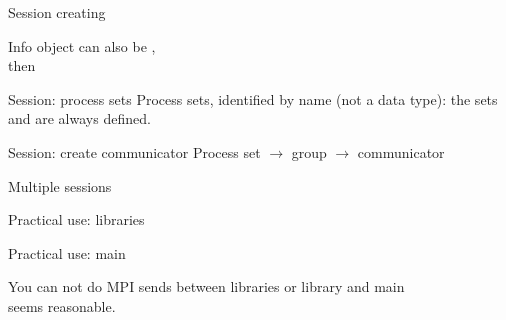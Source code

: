 \begin{numberedframe}{Session creating}

  Info object can also be , \\
  then
\end{numberedframe}

\begin{numberedframe}{Session: process sets}
  Process sets, identified by name (not a data type):
  the sets  and  are always defined.
\end{numberedframe}

\begin{numberedframe}{Session: create communicator}
  Process set $\rightarrow$ group $\rightarrow$ communicator
\end{numberedframe}

\begin{numberedframe}{Multiple sessions}
\end{numberedframe}

\begin{numberedframe}{Practical use: libraries}
\end{numberedframe}

\begin{numberedframe}{Practical use: main}

  You can not do MPI sends between libraries or library and main\\
  seems reasonable.
\end{numberedframe}
